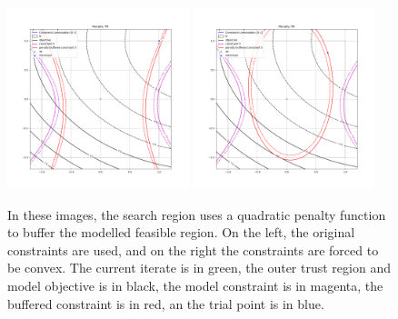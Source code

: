 \begin{figure}[!h]
    \centering
    \includegraphics[width=200px]{images/penalty_tr_0.png}
    \includegraphics[width=200px]{images/penalty_tr_1.png}
    \caption[The quadratic buffered region.] {
		In these images, the search region uses a quadratic penalty function to buffer the modelled feasible region.
		On the left, the original constraints are used, and on the right the constraints are forced to be convex.
		The current iterate is in green,
		the outer trust region and model objective is in black,
		the model constraint is in magenta,
		the buffered constraint is in red,
		an the trial point is in blue.
    }
    \label{quadratic_penalty}
\end{figure}


